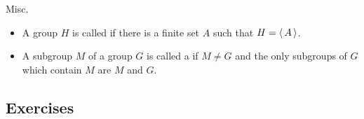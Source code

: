 \documentclass[10pt,a4paper]{report}
\begin{document}
\begin{definition}Misc.
\begin{itemize}

\item A group $H$ is called  if there is a finite set $A$ such that $H = \left \langle\, A \,\right \rangle$.

\item A subgroup $M$ of a group $G$ is called a  if $M\ne G$ and the only subgroups of $G$ which contain $M$ are $M$ and $G$.

\end{itemize}
\end{definition}

\subsection{Exercises}
\end{document}
